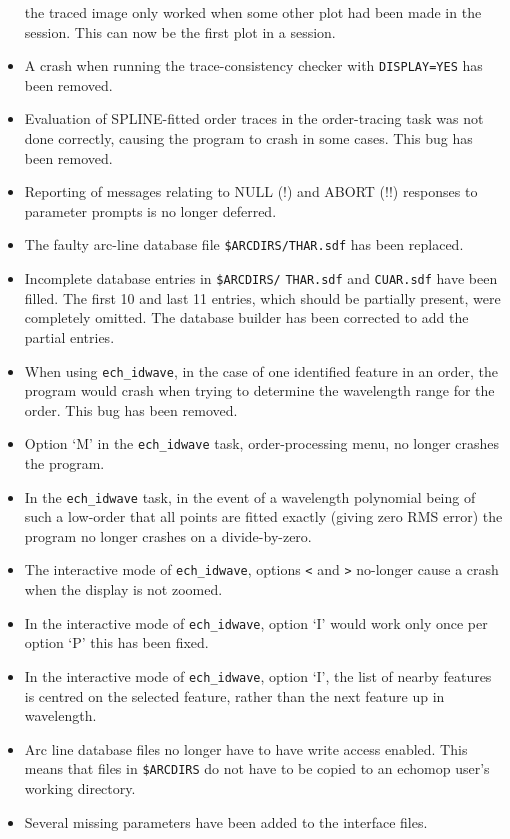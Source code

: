 \begin{itemize}
   the traced image only worked when some other plot had been made in
   the session.  This can now be the first plot in a session.
\item A crash when running the trace-consistency checker with
   {\tt DISPLAY=YES} has been removed.
\item Evaluation of SPLINE-fitted order traces in the order-tracing task
   was not done correctly, causing the program to crash in some cases.
   This bug has been removed.
\item Reporting of messages relating to NULL (!) and ABORT (!!) responses
   to parameter prompts is no longer deferred.
\item The faulty arc-line database file \verb+$ARCDIRS/THAR.sdf+
   has been replaced.
\item Incomplete database entries in \verb+$ARCDIRS/+ \verb+THAR.sdf+ and
   \verb+CUAR.sdf+
   have been filled.  The first 10 and last 11 entries, which should be
   partially present, were completely omitted.  The database builder has
   been corrected to add the partial entries.
\item When using {\tt ech\_idwave}, in the case of one identified feature in an
   order, the program would crash when trying to determine the wavelength
   range for the order.  This bug has been removed.
\item Option `M' in the {\tt ech\_idwave} task, order-processing menu,
   no longer crashes the program.
\item In the {\tt ech\_idwave} task, in the event of a wavelength polynomial
   being
   of such a low-order that all points are fitted exactly (giving zero
   RMS error) the program no longer crashes on a divide-by-zero.
\item The interactive mode of {\tt ech\_idwave}, options \verb+<+ and \verb+>+
   no-longer cause a crash when the display is not zoomed.
\item In the interactive mode of {\tt ech\_idwave}, option `I' would work only
   once per option `P' this has been fixed.
\item In the interactive mode of {\tt ech\_idwave}, option `I', the list of
   nearby
   features is centred on the selected feature, rather than the next
   feature up in wavelength.
\item Arc line database files no longer have to have write access enabled.
   This means that files in \verb+$ARCDIRS+ do not have to be copied to an
   {\sc echomop} user's working directory.
\item Several missing parameters have been added to the interface files.

\end{itemize}
